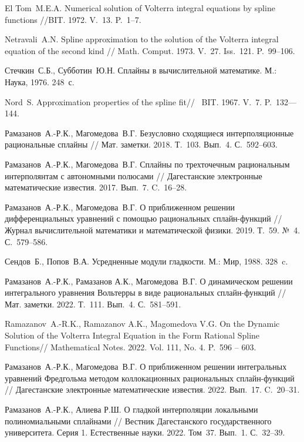 \begin{thebibliography}{111}
 El Tom~M.E.A. Numerical solution of Volterra integral equations by spline
functions //BIT.  1972. V.~13. P.~1--7.

 Netravali~A.N. Spline approximation to the solution of the Volterra integral equation of the
second kind // Math. Comput. 1973. V.~27.
Iss.~121. P.~99--106.

 Стечкин~С.Б., Субботин~Ю.Н. Сплайны в вычислительной математике.
М.: Наука, 1976. 248~с.

 Nord~S. Approximation properties of the spline fit//~ BIT.
1967. V.~7. P.~132—144.

 Рамазанов~А.-Р.К., Магомедова~В.Г. Безусловно сходящиеся
интерполяционные рациональные сплайны // Мат. заметки. 2018. Т.~103.
Вып.~4. С.~592--603.

 Рамазанов~А.-Р.К., Магомедова~В.Г. Сплайны по трехточечным рациональным интерполянтам
с автономными полюсами //
Дагестанские электронные математические известия. 2017. Вып.~7. C.~16--28.

 Рамазанов~А.-Р.К., Магомедова~В.Г. О приближенном решении дифференциальных
уравнений с помощью рациональных сплайн-функций // Журнал вычислительной математики и
математической физики. 2019. Т.~59. №~4. С.~579–586.

 Сендов~Б., Попов~В.А. Усредненные модули гладкости. М.: Мир,
1988. 328~c.

 Рамазанов~А.-Р.К., Рамазанов А.К., Магомедова~В.Г.
О динамическом решении интегрального уравнения Вольтерры в виде
рациональных сплайн-функций // Мат. заметки. 2022. Т.~111.
Вып.~4. С.~581--591.

 Ramazanov~A.-R.K., Ramazanov A.K., Magomedova V.G.
On the Dynamic Solution of the Volterra Integral Equation in the Form
Rational Spline Functions// Mathematical Notes. 2022. Vol. 111, No. 4.
P.~596 – 603.

 Рамазанов~А.-Р.К., Магомедова~В.Г.
О приближенном решении интегральных уравнений Фредгольма методом
коллокационных рациональных сплайн-функций //
Дагестанские электронные математические известия. 2022. Вып.~17. C.~20--31.

 Рамазанов~А.-Р.К., Алиева Р.Ш. О гладкой интерполяции
локальными полиномиальными сплайнами // Вестник Дагестанского
государственного университета. Серия 1. Естественные науки. 2022. Том~37.
Вып.~1. С.~32--39.




\end{thebibliography}
